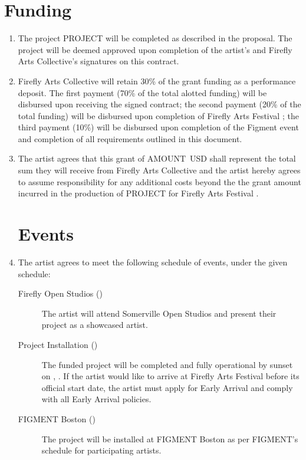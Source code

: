 \documentclass[11pt]{article}
\newcommand{\fac}{Firefly Arts Collective}
\newcommand{\project}{PROJECT}
\newcommand{\amount}{AMOUNT}
\begin{document}
\section*{Funding}
\begin{enumerate}
\item The project \project{} will be completed as described in the proposal.  The project will be deemed approved upon
  completion of the artist's and \fac{}'s signatures on this contract.

\item \fac{} will retain 30\% of the grant funding as a performance deposit.  The first payment (70\% of the total alotted
  funding) will be disbursed upon receiving the signed contract; the second payment (20\% of the total funding)
  will be disbursed upon completion of Firefly Arts Festival \the\year{}; the third payment (10\%) will be disbursed upon
  completion of the Figment \the\year{} event and completion of all requirements outlined in this document.

\item The artist agrees that this grant of \amount{}\ USD shall represent the total sum they will receive from \fac{} and the artist hereby
  agrees to assume responsibility for any additional costs beyond the the grant amount incurred in the production of
  \project{} for Firefly Arts Festival \the\year{}.

\section*{Events}
\item The artist agrees to meet the following schedule of events, under the given schedule:

  \begin{description}
    \item[Firefly Open Studios (\sosdates{})] The artist will attend Somerville Open Studios and present their project
      as a showcased artist.
    \item[Project Installation (\instdate{})] The funded project will be completed and fully operational by sunset on
      \instday{}, \instdate{}.  If the artist would like to arrive at Firefly Arts Festival before its official start
      date, the artist must apply for Early Arrival and comply with all Early Arrival policies.
    \item[FIGMENT Boston \the\year{} (\figdates{})] The project will be installed at FIGMENT Boston \the\year{}
      as per FIGMENT's schedule for participating artists.
  \end{description}


\end{enumerate}
\end{document}
